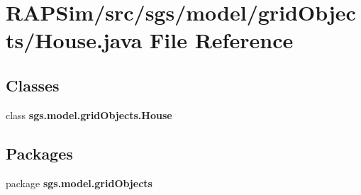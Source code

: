 \section{R\-A\-P\-Sim/src/sgs/model/grid\-Objects/\-House.java File Reference}
\label{_house_8java}
\subsection*{Classes}
\begin{DoxyCompactItemize}
\item 
class {\bf sgs.\-model.\-grid\-Objects.\-House}
\end{DoxyCompactItemize}
\subsection*{Packages}
\begin{DoxyCompactItemize}
\item 
package {\bf sgs.\-model.\-grid\-Objects}
\end{DoxyCompactItemize}
